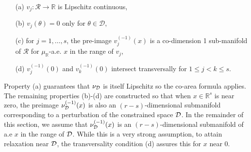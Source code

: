 \documentclass[10pt,fleqn]{article}
\DeclareMathOperator{\1}{\mathbbm{1}} \DeclareMathOperator{\bigO}{\mc O}
\begin{document}
\begin{itemize} \item[(a)] $v_j:\mathcal{R}\to\mathbb{R}$ is
Lipschitz continuous, \item[(b)] $v_j(\theta)=0$ only for
$\theta\in\mathcal{D}$, \item[(c)] for $j=1,\dots, s$, the
pre-image
$v_j^{(-1)}(x)$ is a co-dimension 1 sub-manifold of $\mathcal{R}$
for $\mu_\mathbb{R}$-a.e. $x$ in the range of $v_j$, \item[(d)]
$v_j^{(-1)}(0)$ and $v_k^{(-1)}(0)$ intersect transversally for
$1\le j<k\le s.$ \end{itemize}

Property (a) guarantees that $\nu_{\mathcal{D}}$ is itself Lipschitz so the co-area formula applies.  The remaining
properties (b)-(d) are constructed so that when $x\in\mathbb{R}^s$ is near zero, the preimage $\nu_{\mathcal{D}}^{(-1)}(x)$ is also an $(r-s)$-dimensional submanifold corresponding to a perturbation of the constrained space $\mathcal{D}$. In the remainder of this section, we assume that $\nu_{\mathcal{D}}^{(-1)}(x)$ is an $(r-s)$-dimensional submanifold of a.e $x$ in the range of $\mathcal{D}$.  While this is a very strong assumption, to attain relaxation near $\mathcal{D}$, the transversality condition (d) assures this for $x$ near 0.

\end{document}
